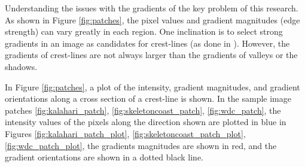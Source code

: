 Understanding the issues with the gradients of the key problem of this research. As shown in Figure \ref{fig:patches}, the pixel values and gradient magnitudes (edge strength) can vary greatly in each region. One inclination is to select strong gradients in an image as candidates for crest-lines (as done in \cite{2015_automated_mapping_of_linear_dunefield}). However, the gradients of crest-lines are not always larger than the gradients of valleys or the shadows. 

In Figure \ref{fig:patches}, a plot of the intensity, gradient magnitudes, and gradient orientations along a cross section of a crest-line is shown. In the sample image patches \ref{fig:kalahari_patch}, \ref{fig:skeletoncoast_patch}, \ref{fig:wdc_patch}, the intensity values of the pixels along the direction shown are plotted in blue in Figures \ref{fig:kalahari_patch_plot}, \ref{fig:skeletoncoast_patch_plot}, \ref{fig:wdc_patch_plot}, the gradients magnitudes are shown in red, and the gradient orientations are shown in a dotted black line. 

